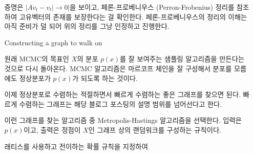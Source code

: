 \documentclass[ %
    a4paper,    %
    amsmath,    %
    itemph,     %
]{oblivoir}     %
\theoremstyle{theorem}
\theoremstyle{theorem}
\theoremstyle{theorem}
\theoremstyle{definition}
\theoremstyle{remark}
\begin{document}
증명은 $|Av_t - v_t| \to 0|$을 보이고, 페론-프로베니우스 (Perron-Frobenius) 정리를 참조하여 
고유벡터의 존재를 보장한다는 걸 확인한다. 페론-프로베니우스의 정리의 이해는 아직 준비가 덜 되어 
위의 정리를 그냥 인정하고 진행한다. 

\begin{tcolorbox}
Constructing a graph to walk on
\end{tcolorbox}

원래 MCMC의 목표인 $X$의 분포 $p(x)$를 잘 보여주는 샘플링 알고리즘을 만든다는 것으로 
다시 돌아온다. MCMC 알고리즘은 마르코프 체인을 잘 구성해서 분포를 모름에도 
정상분포가 $p(x)$가 되도록 하는 것이다. 

이제 정상분포로 수렴하는 적절하면서 빠르게 수렴하는 좋은 그래프를 찾으면 된다. 
빠르게 수렴하는 그래프는 해당 블로그 포스팅의 설명 범위를 넘어선다고 한다. 

이런 그래프를 찾는 알고리즘 중 Metropolis-Hastings 알고리즘을 선택한다. 
입력은 $p(x)$이고, 출력은 정점이 $X$인 그래프 상의 랜덤워크를 구성하는 규칙이다. 

래티스를 사용하고 전이하는 확률 규칙을 지정하여 
\end{document}
